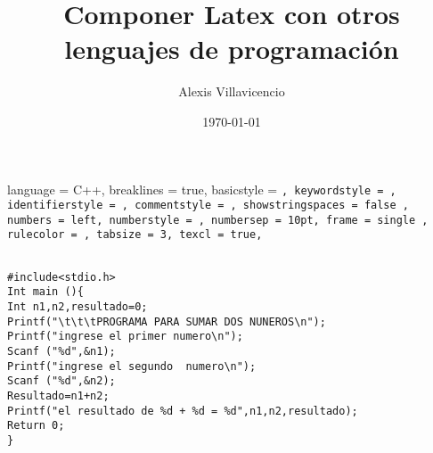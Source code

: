\documentclass[a4paper,12pt]{article}
\title{Componer Latex con otros lenguajes de programación}
\author{Alexis Villavicencio}
\date{\today}
\begin{document}
\lstset
{
language = C++,
breaklines = true,
basicstyle = \tt\footnotesize ,
keywordstyle = \color{purple},
identifierstyle = \color{yellow},
commentstyle = \color{red},
showstringspaces = false ,
 numbers = left,
 numberstyle = \tiny\color{brown},
 numbersep = 10pt,
 frame = single ,
 rulecolor = \color{teal!20},
 tabsize = 3,
 texcl = true,
 }
 \begin{lstlisting}

#include<stdio.h>
Int main (){
Int n1,n2,resultado=0;
Printf("\t\t\tPROGRAMA PARA SUMAR DOS NUNEROS\n");
Printf("ingrese el primer numero\n");
Scanf ("%d",&n1);
Printf("ingrese el segundo  numero\n");
Scanf ("%d",&n2);
Resultado=n1+n2;
Printf("el resultado de %d + %d = %d",n1,n2,resultado);
Return 0;
}

\end{lstlisting}
\end{document}
